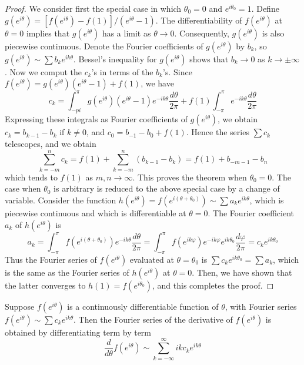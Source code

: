 \documentclass[12pt, a4paper, oneside, openright, titlepage]{book}
\begin{document}
\begin{proof}
    We consider first the special case in which $\theta_0 = 0$ and $e^{i\theta_0} = 1$. Define $g(e^{i\theta}) = [f(e^{i\theta}) - f(1)]/(e^{i\theta}-1)$. The differentiability of $f(e^{i\theta})$ at $\theta = 0$ implies that $g(e^{i\theta})$ has a limit as $\theta\rightarrow 0$. Consequently, $g(e^{i\theta})$ is also piecewise continuous. Denote the Fourier coefficients of $g(e^{i\theta})$ by $b_k$, so $g(e^{i\theta}) \sim \sum b_ke^{ik\theta}$. Bessel's inequality for $g(e^{i\theta})$ shows that $b_k\rightarrow 0$ as $k\rightarrow \pm \infty$. Now we comput the $c_k$'s in terms of the $b_k$'s. Since $f(e^{i\theta}) = g(e^{i\theta})(e^{i\theta}-1)+f(1)$, we have \begin{equation*}
        c_k = \int_{-pi}^{\pi}g(e^{i\theta})(e^{i\theta}-1)e^{-ik\theta}\frac{d\theta}{2\pi}+f(1)\int_{-\pi}^{\pi}e^{-ik\theta}\frac{d\theta}{2\pi}
    \end{equation*}
    Expressing these integrals as Fourier coefficients of $g(e^{i\theta})$, we obtain $c_k = b_{k-1}-b_k$ if $k \neq 0$, and $c_0 = b_{-1}-b_0+f(1)$. Hence the series $\sum c_k$ telescopes, and we obtain \begin{equation*}
        \sum_{k=-m}^nc_k = f(1) + \sum_{k=-m}^n(b_{k-1}-b_k) = f(1) + b_{-m-1}-b_n
    \end{equation*}
    which tends to $f(1)$ as $m,n\rightarrow \infty$. This proves the theorem when $\theta_0 = 0$. The case when $\theta_0$ is arbitrary is reduced to the above special case by a change of variable. Consider the function $h(e^{i\theta}) = f(e^{i(\theta+\theta_0)}) \sim \sum a_ke^{ik\theta}$, which is piecewise continuous and which is differentiable at $\theta = 0$. The Fourier coefficient $a_k$ of $h(e^{i\theta})$ is \begin{equation*}
        a_k = \int_{-\pi}^{\pi}f(e^{i(\theta+\theta_0)})e^{-ik\theta}\frac{d\theta}{2\pi} = \int_{-\pi}^{\pi}f(e^{ik\varphi})e^{-ik\varphi}e^{ik\theta_0}\frac{d\varphi}{2\pi} = c_ke^{ik\theta_0}
    \end{equation*}
    Thus the Fourier series of $f(e^{i\theta})$ evaluated at $\theta = \theta_0$ is $\sum c_ke^{ik\theta_0} = \sum a_k$, which is the same as the Fourier series of $h(e^{i\theta})$ at $\theta = 0$. Then, we have shown that the latter converges to $h(1) = f(e^{i\theta_0})$, and this completes the proof.
\end{proof}

\begin{thm}
    Suppose $f(e^{i\theta})$ is a continuously differentiable function of $\theta$, with Fourier series $f(e^{i\theta}) \sim \sum c_ke^{ik\theta}$. Then the Fourier series of the derivative of $f(e^{i\theta})$ is obtained by differentiating term by term \begin{equation*}
        \frac{d}{d\theta}f(e^{i\theta}) \sim \sum_{k=-\infty}^{\infty}ikc_ke^{ik\theta}
    \end{equation*}
\end{thm}
\end{document}
